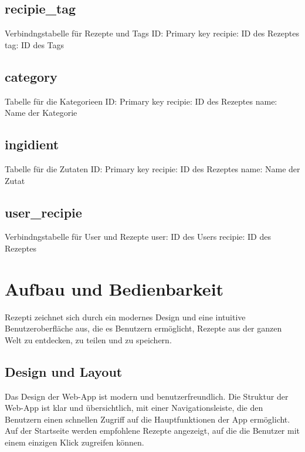 \documentclass{article}
\begin{document}
\subsection{recipie\_tag}
Verbindngstabelle für Rezepte und Tags
\newline
ID: Primary key
\newline
recipie: ID des Rezeptes
\newline
tag: ID des Tags

\subsection{category}
Tabelle für die Kategorieen
\newline
ID: Primary key
\newline
recipie: ID des Rezeptes
\newline
name: Name der Kategorie

\subsection{ingidient}
Tabelle für die Zutaten
\newline
ID: Primary key
\newline
recipie: ID des Rezeptes
\newline
name: Name der Zutat

\subsection{user\_recipie}
Verbindngstabelle für User und Rezepte
\newline
user: ID des Users
\newline
recipie: ID des Rezeptes

\pagebreak

\section{Aufbau und Bedienbarkeit}
Rezepti zeichnet sich durch ein modernes Design und eine intuitive Benutzeroberfläche aus, die es Benutzern ermöglicht, Rezepte aus der ganzen Welt zu entdecken, zu teilen und zu speichern.

\subsection{Design und Layout}
Das Design der Web-App ist modern und benutzerfreundlich. Die Struktur der Web-App ist klar und übersichtlich, mit einer Navigationsleiste, die den Benutzern einen schnellen Zugriff auf die Hauptfunktionen der App ermöglicht. Auf der Startseite werden empfohlene Rezepte angezeigt, auf die die Benutzer mit einem einzigen Klick zugreifen können.
\end{document}

